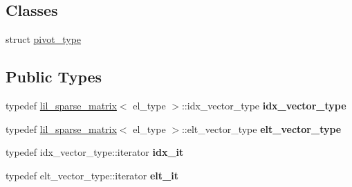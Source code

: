 \subsection*{Classes}
\begin{DoxyCompactItemize}
\item 
struct \hyperlink{structlilc__matrix_1_1pivot__type}{pivot\+\_\+type}
\end{DoxyCompactItemize}
\subsection*{Public Types}
\begin{DoxyCompactItemize}
\item 
typedef \hyperlink{classlil__sparse__matrix}{lil\+\_\+sparse\+\_\+matrix}$<$ el\+\_\+type $>$\+::idx\+\_\+vector\+\_\+type {\bfseries idx\+\_\+vector\+\_\+type}\hypertarget{classlilc__matrix_a83c70482c28275881562ee3937b5f591}{}\label{classlilc__matrix_a83c70482c28275881562ee3937b5f591}

\item 
typedef \hyperlink{classlil__sparse__matrix}{lil\+\_\+sparse\+\_\+matrix}$<$ el\+\_\+type $>$\+::elt\+\_\+vector\+\_\+type {\bfseries elt\+\_\+vector\+\_\+type}\hypertarget{classlilc__matrix_aa5a7b6e31a6c9ebf2ea3a898fe646af6}{}\label{classlilc__matrix_aa5a7b6e31a6c9ebf2ea3a898fe646af6}

\item 
typedef idx\+\_\+vector\+\_\+type\+::iterator {\bfseries idx\+\_\+it}\hypertarget{classlilc__matrix_a8cd399b5bc0ef50dcf5a59a671e32248}{}\label{classlilc__matrix_a8cd399b5bc0ef50dcf5a59a671e32248}

\item 
typedef elt\+\_\+vector\+\_\+type\+::iterator {\bfseries elt\+\_\+it}\hypertarget{classlilc__matrix_ad34c37b7095e283a7e5d7160fe26fd1b}{}\label{classlilc__matrix_ad34c37b7095e283a7e5d7160fe26fd1b}

\end{DoxyCompactItemize}
